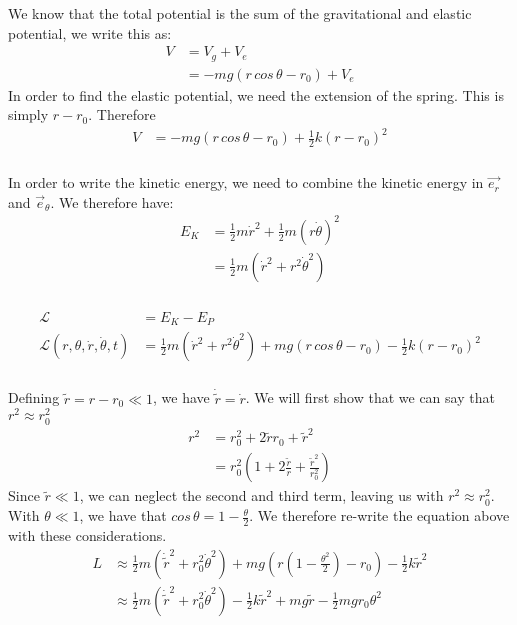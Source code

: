 \documentclass{article}
\begin{document}
We know that the total potential is the sum of the gravitational and elastic potential, we write this as:
\begin{align*}
	V &= V_g + V_e\\
	&=  -mg(r\,cos\,\theta - r_0) + V_e
\end{align*}
In order to find the elastic potential, we need the extension of the spring. This is simply $r - r_0$. Therefore
\begin{align*}
	V &=  -mg(r\,cos\,\theta - r_0) + \frac{1}{2}k(r-r_0)^2
\end{align*}

\subsubsection{} %

In order to write the kinetic energy, we need to combine the kinetic energy in $\vec{e_r}$ and $\vec{e}_{\theta}$. We therefore have:
\begin{align*}
	E_K &= \frac{1}{2}m\dot{r}^2 + \frac{1}{2}m(r\dot{\theta})^2\\
	&= \frac{1}{2}m(\dot{r}^2 + r^2\dot{\theta}^2)
\end{align*}

\subsubsection{} %

\begin{align*}
	\mathcal{L} &= E_{K} - E_P\\
	\mathcal{L}(r,\theta,\dot{r},\dot{\theta},t) &= \frac{1}{2}m(\dot{r}^2 + r^2\dot{\theta}^2) + mg(r\,cos\,\theta - r_0) - \frac{1}{2}k(r-r_0)^2
\end{align*}

\subsubsection{} %

Defining $\tilde{r} = r - r_0 \ll 1$, we have $\dot{\tilde{r}} = \dot{r}$. We will first show that we can say that $r^2 \approx r_0^2$
\begin{align*}
	r^2 &= r_0^2 + 2\tilde{r}r_0 + \tilde{r}^2\\
	&= r_0^2\left( 1 + 2\frac{\tilde{r}}{r} +\frac{\tilde{r}^2}{r_0^2} \right)
\end{align*}
Since $\tilde{r} \ll 1$, we can neglect the second and third term, leaving us with $r^2 \approx r_0^2$.\\
With $\theta \ll 1$, we have that $cos\,\theta = 1 - \frac{\theta}{2}$. We therefore re-write the equation above with these considerations.
\begin{align*}
	L &\approx \frac{1}{2}m(\dot{\tilde{r}}^2 + r_0^2\dot{\theta}^2) + mg(r(1- \frac{\theta^2}{2})- r_0) - \frac{1}{2}k\tilde{r}^2\\
	&\approx \frac{1}{2}m(\dot{\tilde{r}}^2 + r_0^2\dot{\theta}^2)  - \frac{1}{2}k\tilde{r}^2 +mg\tilde{r} - \frac{1}{2}mgr_0\theta^2
\end{align*}
\end{document}

